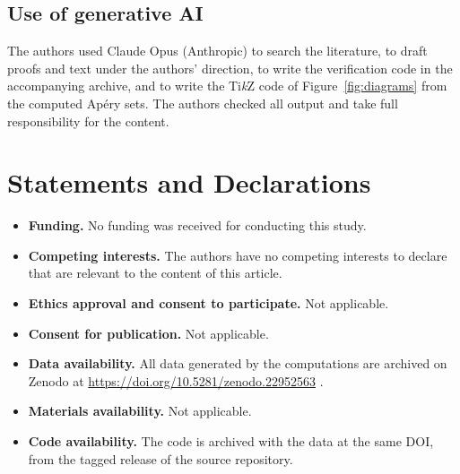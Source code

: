 \subsection*{Use of generative AI}\label{sec:ai}
The authors used Claude Opus (Anthropic) to search the literature, to draft proofs and text under the authors' direction, to write the verification code in the accompanying archive, and to write the Ti\emph{k}Z code of Figure~\ref{fig:diagrams} from the computed Ap\'ery sets. The authors checked all output and take full responsibility for the content.

\backmatter

\section*{Statements and Declarations}

\begin{itemize}
\item \textbf{Funding.} No funding was received for conducting this study.
\item \textbf{Competing interests.} The authors have no competing interests to declare that are relevant to the content of this article.
\item \textbf{Ethics approval and consent to participate.} Not applicable.
\item \textbf{Consent for publication.} Not applicable.
\item \textbf{Data availability.} All data generated by the computations are archived on Zenodo at \url{https://doi.org/10.5281/zenodo.22952563} \cite{code2026}.
\item \textbf{Materials availability.} Not applicable.
\item \textbf{Code availability.} The code is archived with the data at the same DOI, from the tagged release of the source repository.
\end{itemize}
